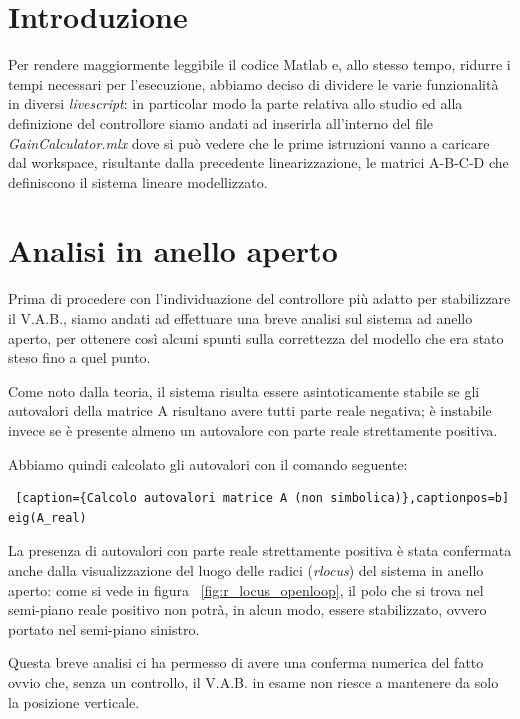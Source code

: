 \section{Introduzione}
Per rendere maggiormente leggibile il codice Matlab e, allo stesso tempo, ridurre i tempi necessari per l'esecuzione, abbiamo deciso di dividere le varie funzionalità in diversi \textit{livescript}: in particolar modo la parte relativa allo studio ed alla definizione del controllore siamo andati ad inserirla all'interno del file \textit{GainCalculator.mlx} dove si può vedere che le prime istruzioni vanno a caricare dal workspace, risultante dalla precedente linearizzazione, le matrici A-B-C-D che definiscono il sistema lineare modellizzato.

\section{Analisi in anello aperto}
\label{sec:open_loop_analysis}
Prima di procedere con l'individuazione del controllore più adatto per stabilizzare il V.A.B., siamo andati ad effettuare una breve analisi sul sistema ad anello aperto, per ottenere così alcuni spunti sulla correttezza del modello che era stato steso fino a quel punto.

Come noto dalla teoria, il sistema risulta essere asintoticamente stabile se gli autovalori della matrice A risultano avere tutti parte reale negativa; è instabile invece se è presente almeno un autovalore con parte reale strettamente positiva.

Abbiamo quindi calcolato gli autovalori con il comando seguente:
\begin{lstlisting} [caption={Calcolo autovalori matrice A (non simbolica)},captionpos=b]
eig(A_real)
\end{lstlisting}

La presenza di autovalori con parte reale strettamente positiva è stata confermata anche dalla visualizzazione del luogo delle radici (\textit{rlocus}) del sistema in anello aperto: come si vede in figura ~\ref{fig:r_locus_openloop}, il polo che si trova nel semi-piano reale positivo non potrà, in alcun modo, essere stabilizzato, ovvero portato nel semi-piano sinistro.

Questa breve analisi ci ha permesso di avere una conferma numerica del fatto ovvio che, senza un controllo, il V.A.B. in esame non riesce a mantenere da solo la posizione verticale.


